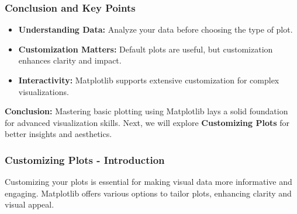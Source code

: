 \documentclass{beamer}
\begin{document}
\begin{frame}
    \frametitle{Conclusion and Key Points}
    \begin{itemize}
        \item \textbf{Understanding Data:} Analyze your data before choosing the type of plot.
        \item \textbf{Customization Matters:} Default plots are useful, but customization enhances clarity and impact.
        \item \textbf{Interactivity:} Matplotlib supports extensive customization for complex visualizations.
    \end{itemize}
    
    \textbf{Conclusion:} Mastering basic plotting using Matplotlib lays a solid foundation for advanced visualization skills. 
    Next, we will explore \textbf{Customizing Plots} for better insights and aesthetics.
\end{frame}

\begin{frame}[fragile]
    \frametitle{Customizing Plots - Introduction}
    Customizing your plots is essential for making visual data more informative and engaging. 
    Matplotlib offers various options to tailor plots, enhancing clarity and visual appeal.
\end{frame}
\end{document}
